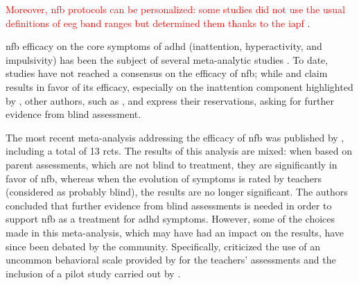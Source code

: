 \textcolor{red}{Moreover, \gls{nfb} protocols can be personalized: some studies did not use the usual definitions of \gls{eeg} band ranges 
but determined them thanks to the \gls{iapf}} \citep{Liu2016, Escolano2014, Bazanova2018}.

\Gls{nfb} efficacy on the core symptoms of \gls{adhd} (inattention, hyperactivity, and impulsivity) has been the 
subject of several meta-analytic studies \citep{Loo2005, Lofthouse2012, Arns2009, Micoulaud2014, Sonuga-Barke2013}. 
To date, studies have not reached a consensus on the efficacy of \gls{nfb}; while \citet{Arns2009} and \citet{Micoulaud2014} 
claim results in favor of its efficacy, especially on the inattention component highlighted by \citeauthor{Micoulaud2014}, other authors, such as
\citet{Loo2005, Lofthouse2012}, and \citet{Sonuga-Barke2013} express their reservations, asking for further evidence from blind assessment.

The most recent meta-analysis addressing the efficacy of \gls{nfb} was published by \citet{Cortese2016}, including a total of 13
\glspl{rct}. The results of this analysis are mixed: when based on parent assessments, which are not blind to treatment, they are significantly 
in favor of \gls{nfb}, whereas when the evolution of symptoms is rated by teachers (considered as probably blind), the results are no longer 
significant. The authors concluded that further evidence from blind assessments is needed in order to support \gls{nfb} as a treatment for \gls{adhd} symptoms.
However, some of the choices made in this meta-analysis, which may have had an impact on the results, have since been debated by the community. Specifically, 
\citet{Micoulaud2016} criticized the use of an uncommon behavioral scale provided by \citet{Steiner2014} for the teachers' assessments 
and the inclusion of a pilot study carried out by \citet{Arnold2014}. 

